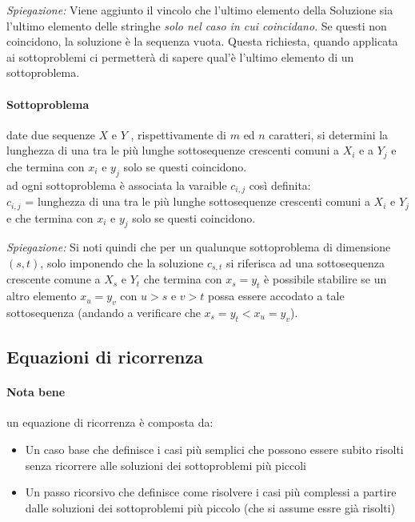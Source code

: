 \documentclass[12pt, a4paper, openany]{book}
\newcommand{\spiegazione}[1]{\begin{box_spiegazione} \small{ \emph{Spiegazione: }#1}\end{box_spiegazione}}
\begin{document}
\spiegazione{
Viene aggiunto il vincolo che l'ultimo elemento della Soluzione sia l'ultimo elemento delle stringhe \emph{solo nel caso in cui coincidano}.
Se questi non coincidono, la soluzione è la sequenza vuota.
Questa richiesta, quando applicata ai sottoproblemi ci permetterà di sapere qual'è l'ultimo elemento di un sottoproblema.
}

\paragraph*{Sottoproblema} date due sequenze $X$ e $Y$ , rispettivamente di $m$ ed $n$ caratteri, si determini la lunghezza di una tra le più lunghe sottosequenze crescenti comuni
a $X_i$ e a $Y_j$ e che termina con $x_i$ e $y_j$ solo se questi coincidono.
\\ad ogni sottoproblema è associata la varaible $c_{i,j}$ così definita:
\\ $c_{i,j}$ = lunghezza di una tra le più lunghe sottosequenze crescenti comuni a $X_i$ e $Y_j$ e che termina con $x_i$ e $y_j$ solo se questi coincidono.

\spiegazione{ 
Si noti quindi che per un qualunque sottoproblema di dimensione $(s, t)$, solo imponendo che la soluzione $c_{s,t}$ si riferisca ad una sottosequenza crescente comune
a $X_s$ e $Y_t$ che termina con $x_s = y_t$ è possibile stabilire se un altro elemento $x_u = y_v$ con $u > s$ e $v > t$ possa essere accodato a tale sottosequenza (andando
a verificare che $x_s = y_t < x_u = y_v$).
}

\subsection{Equazioni di ricorrenza}
\paragraph*{Nota bene} %
un equazione di ricorrenza è composta da:
\begin{itemize}
	\item Un caso base che definisce i casi più semplici che possono essere subito risolti senza ricorrere alle soluzioni dei sottoproblemi più piccoli
	\item Un passo ricorsivo che definisce come risolvere i casi più complessi a partire dalle soluzioni dei sottoproblemi più piccolo (che si assume essre già risolti)
\end{itemize}
\end{document}
